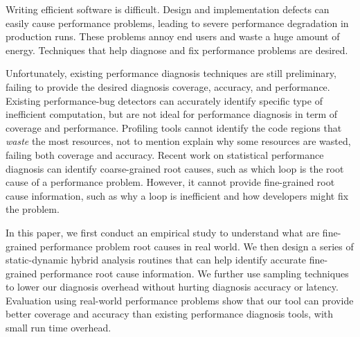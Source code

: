 Writing efficient software is difficult.
Design and implementation defects can easily cause performance problems, 
leading to severe performance 
degradation in production runs. These problems annoy end users
and waste a huge amount of energy. Techniques that help
diagnose and fix performance problems are desired.

Unfortunately, existing performance diagnosis techniques are still preliminary,
failing to provide the desired diagnosis coverage, accuracy, and performance. 
Existing performance-bug detectors can accurately identify specific type
of inefficient computation, but are not ideal for performance diagnosis
in term of coverage and performance. 
Profiling tools cannot identify
the code regions that \textit{waste} the most resources, not to mention
explain why some resources are wasted, failing
both coverage and accuracy.
Recent work on statistical performance diagnosis can
identify coarse-grained root causes, such as which loop
is the root cause of a performance problem. However, it cannot provide 
fine-grained root cause information, such as why a loop is inefficient and
how developers might fix the problem.

In this paper, we first conduct an empirical study to understand what are
fine-grained performance problem root causes in real world. 
We then design a series of static-dynamic hybrid analysis routines that can
help identify accurate fine-grained performance root cause information.
We further use sampling techniques to lower our diagnosis overhead without
hurting diagnosis accuracy or latency. Evaluation using real-world performance
problems show that our tool can provide better coverage and accuracy than
existing performance diagnosis tools, with small run time overhead.
